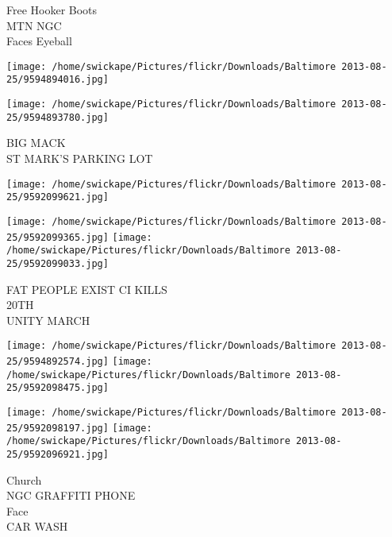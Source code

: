 \documentclass[10pt,letterpaper]{article}
\begin{document}
Free Hooker Boots\\
MTN NGC\\
Faces Eyeball\\
\pagebreak

\texttt{[image: /home/swickape/Pictures/flickr/Downloads/Baltimore 2013-08-25/9594894016.jpg]}

\vspace{0.25in}
\texttt{[image: /home/swickape/Pictures/flickr/Downloads/Baltimore 2013-08-25/9594893780.jpg]}

BIG MACK\\
ST MARK'S PARKING LOT\\
\pagebreak

\texttt{[image: /home/swickape/Pictures/flickr/Downloads/Baltimore 2013-08-25/9592099621.jpg]}

\vspace{0.25in}
\texttt{[image: /home/swickape/Pictures/flickr/Downloads/Baltimore 2013-08-25/9592099365.jpg]}
\texttt{[image: /home/swickape/Pictures/flickr/Downloads/Baltimore 2013-08-25/9592099033.jpg]}

FAT PEOPLE EXIST CI KILLS\\
20TH\\
UNITY MARCH\\
\pagebreak

\texttt{[image: /home/swickape/Pictures/flickr/Downloads/Baltimore 2013-08-25/9594892574.jpg]}
\texttt{[image: /home/swickape/Pictures/flickr/Downloads/Baltimore 2013-08-25/9592098475.jpg]}

\texttt{[image: /home/swickape/Pictures/flickr/Downloads/Baltimore 2013-08-25/9592098197.jpg]}
\texttt{[image: /home/swickape/Pictures/flickr/Downloads/Baltimore 2013-08-25/9592096921.jpg]}

Church\\
NGC GRAFFITI PHONE\\
Face\\
CAR WASH\\
\pagebreak
\end{document}
